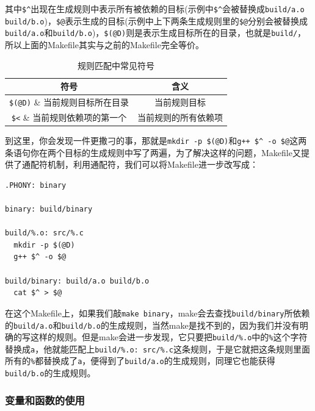 \documentclass[lang=cn,11pt,a4paper]{elegantpaper}
\begin{document}
其中\lstinline!$^!出现在生成规则中表示所有被依赖的目标(示例中\lstinline!$^!会被替换成\lstinline!build/a.o build/b.o!)，\lstinline!$@!表示生成的目标(示例中上下两条生成规则里的\lstinline!$@!分别会被替换成\lstinline!build/a.o!和\lstinline!build/b.o!)，\lstinline!$(@D)!则是表示生成目标所在的目录，也就是\lstinline!build/!，所以上面的Makefile其实与之前的Makefile完全等价。

\begin{table}[htbp]
\centering
\begin{tabular}{|c|c|}
\hline
符号&含义 \\\hline
\lstinline|$(@D)| & 当前规则目标所在目录 \\\hline
\lstinline|$@| & 当前规则目标 \\\hline
\lstinline|$<| & 当前规则依赖项的第一个 \\\hline
\lstinline|$^| & 当前规则的所有依赖项 \\\hline
\end{tabular}
\caption{规则匹配中常见符号}
\end{table}

到这里，你会发现一件更撒刁的事，那就是\lstinline!mkdir -p $(@D)!和\lstinline!g++ $^ -o $@!这两条语句你在两个目标的生成规则中写了两遍，为了解决这样的问题，Makefile又提供了通配符机制，利用通配符，我们可以将Makefile进一步改写成：

\begin{lstlisting}
.PHONY: binary

binary: build/binary

build/%.o: src/%.c
  mkdir -p $(@D)
  g++ $^ -o $@

build/binary: build/a.o build/b.o
  cat $^ > $@
\end{lstlisting}

在这个Makefile上，如果我们敲\lstinline!make binary!，make会去查找\lstinline!build/binary!所依赖的\lstinline!build/a.o!和\lstinline!build/b.o!的生成规则，当然make是找不到的，因为我们并没有明确的写这样的规则。但是make会进一步发现，它只要把\lstinline!build/%.o!中的\lstinline!%!这个字符替换成\lstinline!a!，他就能匹配上\lstinline!build/%.o: src/%.c!这条规则，于是它就把这条规则里面所有的\lstinline!%!都替换成了\lstinline!a!，便得到了\lstinline!build/a.o!的生成规则，同理它也能获得\lstinline!build/b.o!的生成规则。

\subsubsection{变量和函数的使用}
\end{document}
